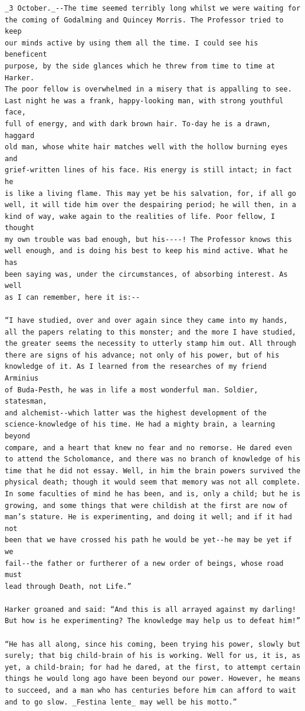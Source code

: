 \documentclass{article}
\begin{document}
\begin{verbatim}
_3 October._--The time seemed terribly long whilst we were waiting for
the coming of Godalming and Quincey Morris. The Professor tried to keep
our minds active by using them all the time. I could see his beneficent
purpose, by the side glances which he threw from time to time at Harker.
The poor fellow is overwhelmed in a misery that is appalling to see.
Last night he was a frank, happy-looking man, with strong youthful face,
full of energy, and with dark brown hair. To-day he is a drawn, haggard
old man, whose white hair matches well with the hollow burning eyes and
grief-written lines of his face. His energy is still intact; in fact he
is like a living flame. This may yet be his salvation, for, if all go
well, it will tide him over the despairing period; he will then, in a
kind of way, wake again to the realities of life. Poor fellow, I thought
my own trouble was bad enough, but his----! The Professor knows this
well enough, and is doing his best to keep his mind active. What he has
been saying was, under the circumstances, of absorbing interest. As well
as I can remember, here it is:--

“I have studied, over and over again since they came into my hands,
all the papers relating to this monster; and the more I have studied,
the greater seems the necessity to utterly stamp him out. All through
there are signs of his advance; not only of his power, but of his
knowledge of it. As I learned from the researches of my friend Arminius
of Buda-Pesth, he was in life a most wonderful man. Soldier, statesman,
and alchemist--which latter was the highest development of the
science-knowledge of his time. He had a mighty brain, a learning beyond
compare, and a heart that knew no fear and no remorse. He dared even
to attend the Scholomance, and there was no branch of knowledge of his
time that he did not essay. Well, in him the brain powers survived the
physical death; though it would seem that memory was not all complete.
In some faculties of mind he has been, and is, only a child; but he is
growing, and some things that were childish at the first are now of
man’s stature. He is experimenting, and doing it well; and if it had not
been that we have crossed his path he would be yet--he may be yet if we
fail--the father or furtherer of a new order of beings, whose road must
lead through Death, not Life.”

Harker groaned and said: “And this is all arrayed against my darling!
But how is he experimenting? The knowledge may help us to defeat him!”

“He has all along, since his coming, been trying his power, slowly but
surely; that big child-brain of his is working. Well for us, it is, as
yet, a child-brain; for had he dared, at the first, to attempt certain
things he would long ago have been beyond our power. However, he means
to succeed, and a man who has centuries before him can afford to wait
and to go slow. _Festina lente_ may well be his motto.”


\end{verbatim}
\end{document}
